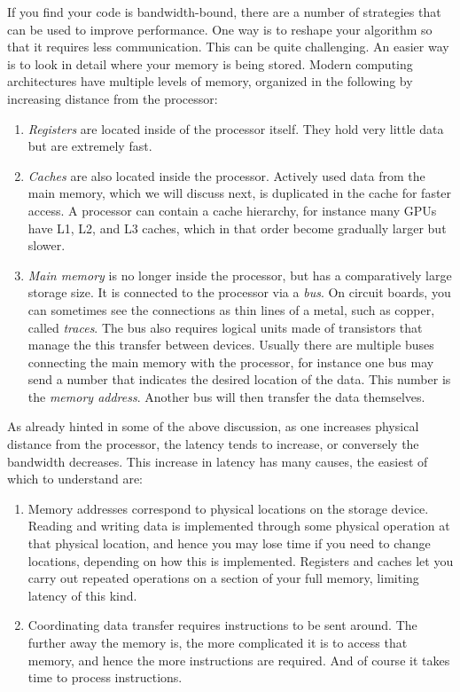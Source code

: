 If you find your code is bandwidth-bound, there are a number of strategies that
can be used to improve performance. One way is to reshape your algorithm so that
it requires less communication. This can be quite challenging. An easier way is
to look in detail where your memory is being stored. Modern computing
architectures have multiple levels of memory, organized in the following by
increasing distance from the processor:
\begin{enumerate}
  \item {\it Registers} are located inside of the processor
itself. They hold very little data but are extremely fast.
  \item {\it Caches} are also located inside the processor.
Actively used data from the main memory, which we will discuss next, is duplicated
in the cache for faster access. A processor can contain a cache hierarchy, for
instance many GPUs have L1, L2, and L3 caches, which in that order become
gradually larger but slower.
  \item {\it Main memory} is no longer inside the processor,
but has a comparatively large storage size. It is connected to the processor
via a {\it bus}. On circuit boards, you can sometimes see the 
connections as thin lines of a metal, such as copper, called {\it
traces}. The bus also requires logical units made of transistors
that manage the this transfer between devices.
Usually there are multiple buses connecting the main
memory with the processor, for instance one bus may send a number that indicates
the desired location of the data. This number is the {\it memory address}.
Another bus will then transfer the data themselves.
\end{enumerate}
As already hinted in some of the above discussion, as one increases physical
distance from the processor, the latency tends to increase, or conversely the
bandwidth decreases. This increase in latency has many causes, the easiest of
which to understand are:
\begin{enumerate}
  \item Memory addresses correspond to physical locations on the storage device.
Reading and writing data is implemented through some physical operation at that
physical location, and hence you may lose time if you need to change locations,
depending on how this is implemented. Registers and caches let you carry out
repeated operations on a section of your full memory, limiting latency of this kind.
  \item Coordinating data transfer requires instructions to be sent around. The
further away the memory is, the more complicated it is to access that memory,
and hence the more instructions are required. And of course it takes time to
process instructions.
\end{enumerate}

